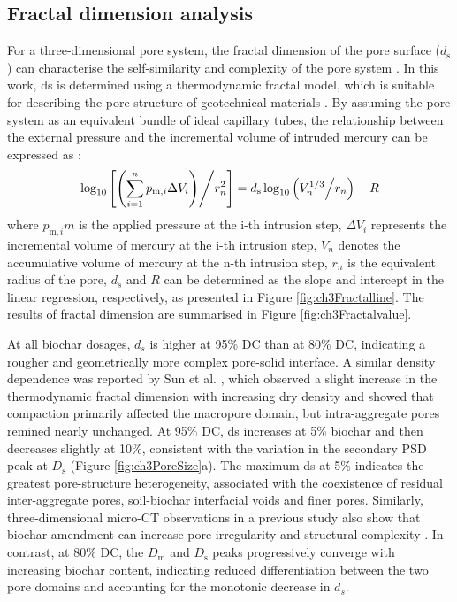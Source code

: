 \subsection{Fractal dimension analysis}
\label{sec:fractaldimension}
For a three-dimensional pore system, the fractal dimension of the pore surface ($d_\mathrm{s}$) can characterise the self-similarity and complexity of the pore system \parencite{perfectApplicationsFractalsSoil1995, hanRelationshipFractalFeature2022}. In this work, ds is determined using a thermodynamic fractal model, which is suitable for describing the pore structure of geotechnical materials \parencite{shiStrengthMicroscopicPore2024}. By assuming the pore system as an equivalent bundle of ideal capillary tubes, the relationship between the external pressure and the incremental volume of intruded mercury can be expressed as \parencite{shiStrengthMicroscopicPore2024}:
\begin{equation}
    \log_{10} \left[ \left( \sum_{i = 1}^{n} p_{\mathrm{m},i} \Delta V_i \right) \middle/ r_{n}^2 \right] = d_{\mathrm{s}} \log_{10} \left( V_{n}^{1/3} \middle/ r_{n} \right) + R
\end{equation}
where $p_{\mathrm{m},i}m$ is the applied pressure at the i-th intrusion step, $\Delta V_i$ represents the incremental volume of mercury at the i-th intrusion step, $V_n$ denotes the accumulative volume of mercury at the n-th intrusion step, $r_n$ is the equivalent radius of the pore, $d_s$ and $R$ can be determined as the slope and intercept in the linear regression, respectively, as presented in Figure \ref{fig:ch3Fractalline}. The results of fractal dimension are summarised in Figure \ref{fig:ch3Fractalvalue}.\par
At all biochar dosages, $d_s$ is higher at 95\% \ac{DC} than at 80\% \ac{DC}, indicating a rougher and geometrically more complex pore-solid interface. A similar density dependence was reported by Sun et al. \parencite*{sunFractalCharacteristicsPore2020}, which observed a slight increase in the thermodynamic fractal dimension with increasing dry density and showed that compaction primarily affected the macropore domain, but intra-aggregate pores remined nearly unchanged. At 95\% \ac{DC}, ds increases at 5\% biochar and then decreases slightly at 10\%, consistent with the variation in the secondary \ac{PSD} peak at $D_\mathrm{s}$ (Figure \ref{fig:ch3PoreSize}a). The maximum ds at 5\% indicates the greatest pore-structure heterogeneity, associated with the coexistence of residual inter-aggregate pores, soil-biochar interfacial voids and finer pores. Similarly, three-dimensional micro-CT observations in a previous study also show that biochar amendment can increase pore irregularity and structural complexity \parencite{sunThreedimensionalFractalCharacteristics2021}. In contrast, at 80\% \ac{DC}, the $D_\mathrm{m}$ and $D_\mathrm{s}$ peaks progressively converge with increasing biochar content, indicating reduced differentiation between the two pore domains and accounting for the monotonic decrease in $d_s$.\par
